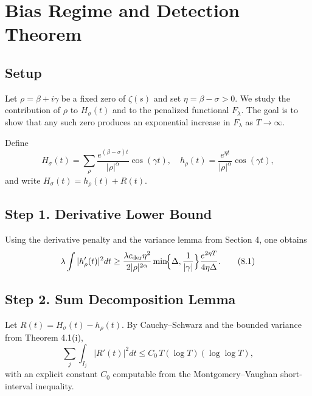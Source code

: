 
\section{Bias Regime and Detection Theorem}

\subsection{Setup}

Let $\rho=\beta+i\gamma$ be a fixed zero of $\zeta(s)$ and
set $\eta=\beta-\sigma>0$.  
We study the contribution of $\rho$ to $H_\sigma(t)$ and to the
penalized functional $F_\lambda$.  
The goal is to show that any such zero produces an exponential
increase in $F_\lambda$ as $T\to\infty$.

\begin{definition}
Define
\[
H_\sigma(t)
 = \sum_{\rho} \frac{e^{(\beta-\sigma)t}}{|\rho|^{\alpha}}\cos(\gamma t),
\quad
h_\rho(t)
 = \frac{e^{\eta t}}{|\rho|^{\alpha}}\cos(\gamma t),
\]
and write $H_\sigma(t)=h_\rho(t)+R(t)$.
\end{definition}

\subsection{Step 1.  Derivative Lower Bound}

Using the derivative penalty and the variance lemma from Section 4,
one obtains
\[
\lambda \int |h_\rho'(t)|^2 dt
  \ge \frac{\lambda c_{\mathrm{der}}\eta^2}{2|\rho|^{2\alpha}}
  \min\!\Bigl\{\Delta,\frac{1}{|\gamma|}\Bigr\}
  \frac{e^{2\eta T}}{4\eta\Delta}.
\tag{8.1}
\]

\subsection{Step 2.  Sum Decomposition Lemma}

Let $R(t)=H_\sigma(t)-h_\rho(t)$.  
By Cauchy–Schwarz and the bounded variance from Theorem 4.1(i),
\[
\sum_j\!\int_{I_j}\!|R'(t)|^2dt
   \le C_0\,T(\log T)(\log\log T),
\tag{8.2}
\]
with an explicit constant $C_0$ computable from the Montgomery–Vaughan
short-interval inequality.

